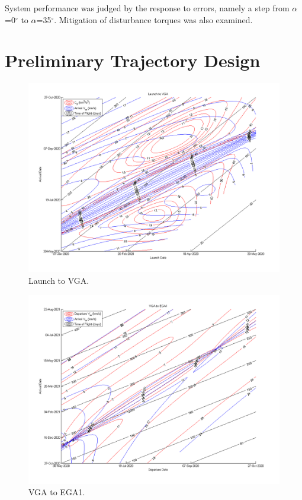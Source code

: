 \documentclass[]{aiaa-tc}%
\begin{document}
	\vspace{5 mm}

System performance was judged by the response to errors, namely a step from $\alpha$=0$^{\circ}$ to $\alpha$=35$^{\circ}$. Mitigation of disturbance torques was also examined.

	\section{Preliminary Trajectory Design}
	\begin{figure}[H]
		\centering
			\includegraphics[width = 18cm]{../PCP/VEEJ/1_Launch_VGA.png}
		\caption{Launch to VGA. }
		\label{fig:PCP_Launch_VGA}
	\end{figure}	

	\begin{figure}[H]
		\centering
			\includegraphics[width = 18cm]{../PCP/VEEJ/2_VGA_EGA1.png}
		\caption{VGA to EGA1. }
		\label{fig:PCP_VGA_EGA1}
	\end{figure}	
\end{document}
